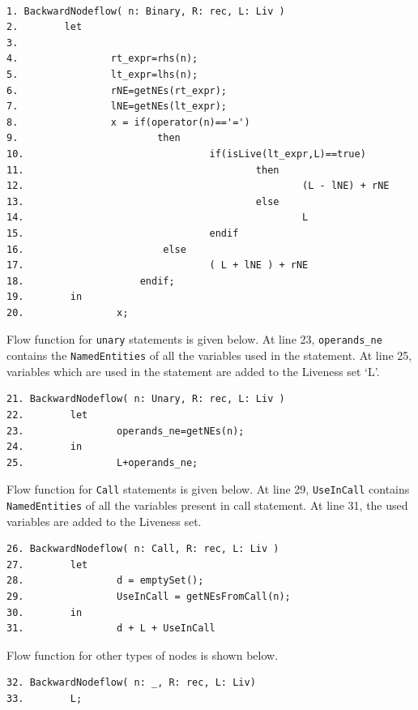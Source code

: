 \documentclass[11pt,a4paper,openright]{report}
\begin{document}
\begin{lstlisting}

1. BackwardNodeflow( n: Binary, R: rec, L: Liv )
2.        let
3.                
4.                rt_expr=rhs(n);
5.                lt_expr=lhs(n);
6.                rNE=getNEs(rt_expr);
7.                lNE=getNEs(lt_expr);
8.                x = if(operator(n)=='=')
9.                        then
10.                                if(isLive(lt_expr,L)==true)
11.                                        then
12.                                                (L - lNE) + rNE
13.                                        else
14.                                                L
15.                                endif
16.                        else
17.                                ( L + lNE ) + rNE
18.	                   endif;
19.        in
20.                x;

\end{lstlisting}


Flow function for \texttt{unary} statements is given below. At line 23, \texttt{operands\_ne} contains the \texttt{NamedEntities} of all the variables used in the 
statement. At line 25, variables which are used in the statement are added to the Liveness set `L'.

\begin{lstlisting}
21. BackwardNodeflow( n: Unary, R: rec, L: Liv )
22.        let
23.                operands_ne=getNEs(n);
24.        in
25.                L+operands_ne;

\end{lstlisting}

Flow function for \texttt{Call} statements is given below. At line 29, \texttt{UseInCall} contains \texttt{NamedEntities} of all the variables present in call
statement. At line 31, the used variables are added to the Liveness set.

\begin{lstlisting}
26. BackwardNodeflow( n: Call, R: rec, L: Liv )
27.        let
28.                d = emptySet();
29.                UseInCall = getNEsFromCall(n);
30.        in
31.                d + L + UseInCall
\end{lstlisting}

Flow function for other types of nodes is shown below.

\begin{lstlisting}
32. BackwardNodeflow( n: _, R: rec, L: Liv)
33.        L;
\end{lstlisting}
\end{document}
